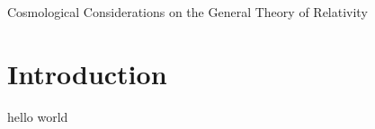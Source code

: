 \paperheader
	{Cosmological Considerations on the General Theory of Relativity}
	{}
	{}


\section{Introduction}
hello world